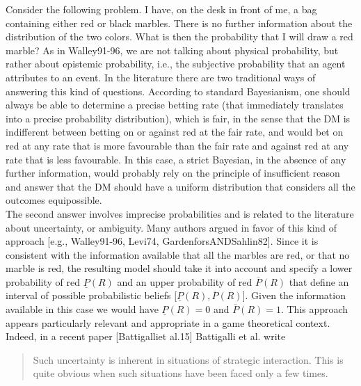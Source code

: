 \documentclass[fleqn,reqno,11pt]{article}
\begin{document}
Consider the following problem. I have, on the desk in front of me, a bag containing either red or black marbles. There is no further information about the distribution of the two colors. What is then the probability that I will draw a red marble? As in Walley91-96, we are not talking about physical probability, but rather about epistemic probability, i.e., the subjective probability that an agent attributes to an event.
In the literature there are two traditional ways of answering this kind of questions. According to standard Bayesianism, one should always be able to determine a precise betting rate (that immediately translates into a precise probability distribution), which is fair, in the sense that the DM is indifferent between betting on or against red at the fair rate, and would bet on red at any rate that is more favourable than the fair rate and against red at any rate that is less favourable. In this case, a strict Bayesian, in the absence of any further information, would probably rely on the principle of insufficient reason and answer that the DM should have a uniform distribution that considers all the outcomes equipossible. \\
The second answer involves imprecise probabilities and is related to the literature about uncertainty, or ambiguity. Many authors argued in favor of this kind of approach [e.g., Walley91-96, Levi74, GardenforsANDSahlin82]. Since it is consistent with the information available that all the marbles are red, or that no marble is red, the resulting model should take it into account and specify a lower probability of red $\underline{P}(R)$ and an upper probability of red $\overline{P}(R)$ that define an interval of possible probabilistic beliefs [$\underline{P}(R), \overline{P}(R)$]. Given the information available in this case we would have $\underline{P}(R)=0$ and $\overline{P}(R)=1$. This approach appears particularly relevant and appropriate in a game theoretical context. Indeed, in a recent paper [Battigalliet al.15] Battigalli et al. write

\begin{quote}
Such uncertainty is inherent in situations of strategic interaction. This is quite obvious when such situations have been faced only a few times.
\end{quote}
\end{document}
